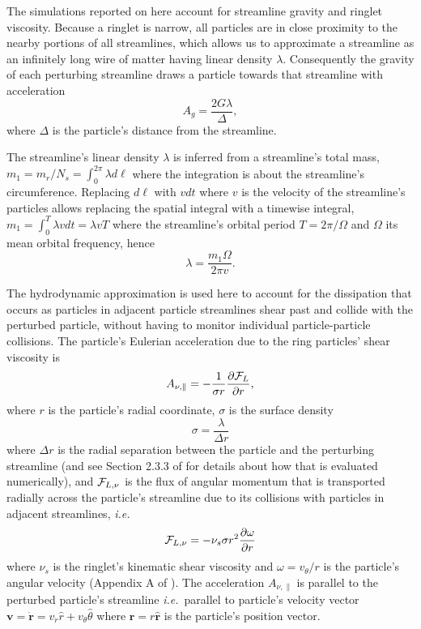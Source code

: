 \documentclass[preprint]{aastex62}
\begin{document}
The simulations reported on here account for streamline gravity
and ringlet viscosity. Because a ringlet is narrow, all particles
are in close proximity to the nearby portions of all streamlines,
which allows us to approximate a streamline as an infinitely
long wire of matter having linear density $\lambda$.
Consequently the gravity of each perturbing streamline draws a particle
towards that streamline with acceleration
\begin{equation}
\label{eqn:gravity}
    A_g=\frac{2G\lambda}{\Delta },
\end{equation}
where $\Delta$ is the particle's distance from the streamline.

The streamline's linear density $\lambda$ is inferred from a streamline's total
mass, $m_1=m_r/N_s=\int_0^{2\pi}\lambda d\ell$
where the integration is about the streamline's circumference. Replacing
$d\ell$ with $vdt$ where $v$ is the velocity of the streamline's particles
allows replacing the spatial integral with a timewise integral,
$m_1=\int_0^{T}\lambda vdt = \lambda v T$ where the streamline's
orbital period $T=2\pi/\Omega$ and $\Omega$ its mean orbital frequency, hence
\begin{equation}
\label{eqn:lambda}
    \lambda=\frac{m_1\Omega}{2\pi v}.
\end{equation}

The hydrodynamic approximation is used here to account for
the dissipation that occurs as particles in adjacent particle streamlines
shear past and collide with the perturbed particle,
without having to monitor individual particle-particle collisions.
The particle's Eulerian acceleration due to the ring particles' shear viscosity is
\begin{equation}
\label{eqn:shear_viscosity}
    A_{\nu,\parallel}=-\frac{1}{\sigma r}\frac{\partial {\cal F}_L}{\partial r},
\end{equation}
where $r$ is the particle's radial coordinate, $\sigma$ is the surface density
\begin{equation}
    \label{eqn:sigma}
    \sigma = \frac{\lambda}{\Delta r}
\end{equation}
where $\Delta r$ is the radial separation between the particle
and the perturbing streamline (and see Section 2.3.3 of \cite{HS13} for details
about how that is evaluated numerically),
and ${\cal F}_{L,\nu}$ is the flux of angular momentum
that is transported radially across the particle's streamline
due to its collisions with particles in adjacent streamlines, {\it i.e.}\
\begin{equation}
    \label{eqn:F_nu_theta}
    {\cal F}_{L,\nu} = -\nu_s \sigma r^2\frac{\partial\omega}{\partial r}
\end{equation}
where $\nu_s$ is the ringlet's kinematic shear viscosity
and $\omega=v_\theta/r$ is the particle's angular velocity (Appendix A of \citealt{HS13}).
The acceleration $A_{\nu,\parallel }$ is parallel to the perturbed particle's streamline
{\it i.e.}\ parallel to particle's velocity vector
$\mathbf{v}=\dot{\mathbf{r}}=v_r\hat{r} + v_\theta\hat{\theta}$ 
where $\mathbf{r} = r\hat{\mathbf{r}}$ is the particle's position vector.
\end{document}

